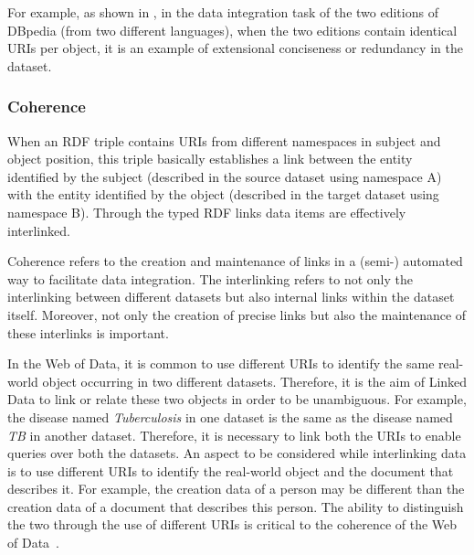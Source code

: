 For example, as shown in \cite{Mendes}, in the data integration task of the two editions of DBpedia (from two different languages), when the two editions contain identical URIs per object, it is an example of extensional conciseness or redundancy in the dataset.

\subsubsection{Coherence}
When an RDF triple contains URIs from different namespaces in subject and object position, this triple basically establishes a link between the entity identified by the subject (described in the source dataset using namespace A) with the entity identified by the object (described in the target dataset using namespace B). 
Through the typed RDF links data items are effectively interlinked.

\begin{definition}[Coherence]
Coherence refers to the creation and maintenance of links in a (semi-) automated way to facilitate data integration.
The interlinking refers to not only the interlinking between different datasets but also internal links within the dataset itself. 
Moreover, not only the creation of precise links but also the maintenance of these interlinks is important. 
\end{definition}

In the Web of Data, it is common to use different URIs to identify the same real-world object occurring in two different datasets. 
Therefore, it is the aim of Linked Data to link or relate these two objects in order to be unambiguous. 
For example, the disease named \emph{Tuberculosis} in one dataset is the same as the disease named \emph{TB} in another dataset. 
Therefore, it is necessary to link both the URIs to enable queries over both the datasets. 
An aspect to be considered while interlinking data is to use different URIs to identify the real-world object and the document that describes it.
For example, the creation data of a person may be different than the creation data of a document that describes this person.
The ability to distinguish the two through the use of different URIs is critical to the coherence of the Web of Data~\cite{Heath}.


